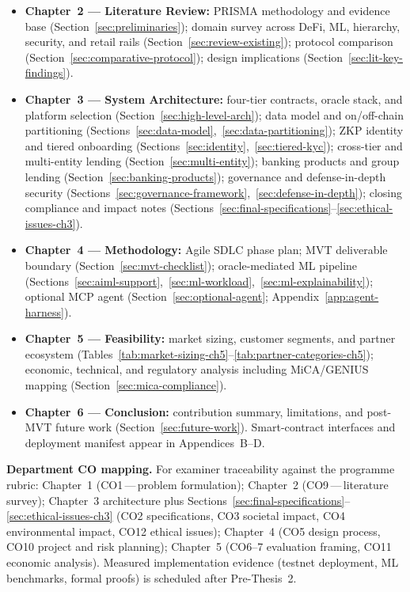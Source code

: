 \documentclass[12pt, a4paper]{report}
\begin{document}
\begin{itemize}[noitemsep]
\item \textbf{Chapter~2 --- Literature Review:} PRISMA methodology and evidence base (Section~\ref{sec:preliminaries}); domain survey across DeFi, ML, hierarchy, security, and retail rails (Section~\ref{sec:review-existing}); protocol comparison (Section~\ref{sec:comparative-protocol}); design implications (Section~\ref{sec:lit-key-findings}).
\item \textbf{Chapter~3 --- System Architecture:} four-tier contracts, oracle stack, and platform selection (Section~\ref{sec:high-level-arch}); data model and on/off-chain partitioning (Sections~\ref{sec:data-model},~\ref{sec:data-partitioning}); ZKP identity and tiered onboarding (Sections~\ref{sec:identity},~\ref{sec:tiered-kyc}); cross-tier and multi-entity lending (Section~\ref{sec:multi-entity}); banking products and group lending (Section~\ref{sec:banking-products}); governance and defense-in-depth security (Sections~\ref{sec:governance-framework},~\ref{sec:defense-in-depth}); closing compliance and impact notes (Sections~\ref{sec:final-specifications}--\ref{sec:ethical-issues-ch3}).
\item \textbf{Chapter~4 --- Methodology:} Agile SDLC phase plan; MVT deliverable boundary (Section~\ref{sec:mvt-checklist}); oracle-mediated ML pipeline (Sections~\ref{sec:aiml-support},~\ref{sec:ml-workload},~\ref{sec:ml-explainability}); optional MCP agent (Section~\ref{sec:optional-agent}; Appendix~\ref{app:agent-harness}).
\item \textbf{Chapter~5 --- Feasibility:} market sizing, customer segments, and partner ecosystem (Tables~\ref{tab:market-sizing-ch5}--\ref{tab:partner-categories-ch5}); economic, technical, and regulatory analysis including MiCA/GENIUS mapping (Section~\ref{sec:mica-compliance}).
\item \textbf{Chapter~6 --- Conclusion:} contribution summary, limitations, and post-MVT future work (Section~\ref{sec:future-work}). Smart-contract interfaces and deployment manifest appear in Appendices~B--D.
\end{itemize}

\noindent\textbf{Department CO mapping.} For examiner traceability against the programme rubric: Chapter~1 (CO1\,---\,problem formulation); Chapter~2 (CO9\,---\,literature survey); Chapter~3 architecture plus Sections~\ref{sec:final-specifications}--\ref{sec:ethical-issues-ch3} (CO2 specifications, CO3 societal impact, CO4 environmental impact, CO12 ethical issues); Chapter~4 (CO5 design process, CO10 project and risk planning); Chapter~5 (CO6--7 evaluation framing, CO11 economic analysis). Measured implementation evidence (testnet deployment, ML benchmarks, formal proofs) is scheduled after Pre-Thesis~2.
\end{document}
